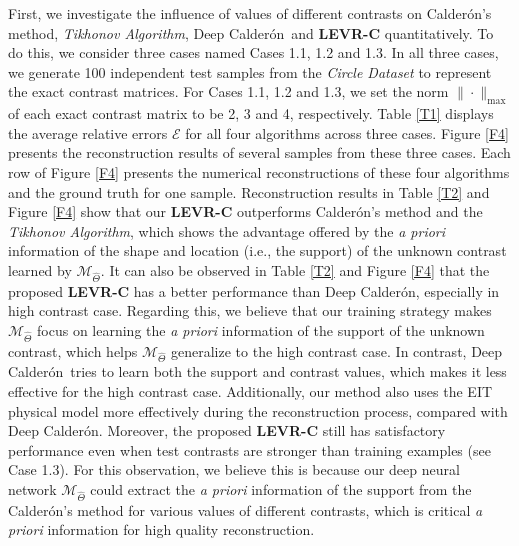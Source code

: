 \documentclass[11pt]{article}
\newcommand{\Calderon}{Calder\'{o}n}
\begin{document}
First, we investigate the influence of values of different contrasts on \Calderon's method, \textit{Tikhonov Algorithm}, Deep \Calderon\ and \textbf{LEVR-C} quantitatively.
To do this, we consider three cases named Cases 1.1, 1.2 and 1.3.
In all three cases, we generate 100 independent test samples from the \textit{Circle Dataset} to represent the exact contrast matrices.
For Cases 1.1, 1.2 and 1.3, we set the norm $\|\cdot\|_{\max}$ of each exact contrast matrix to be 2, 3 and 4, respectively.
Table \ref{T1} displays the average relative errors $\mathcal{E}$ for all four algorithms across three cases.
Figure \ref{F4} presents the reconstruction results of several samples from these three cases. 
Each row of Figure \ref{F4} presents the numerical reconstructions of these four algorithms and the ground truth for one sample. 
Reconstruction results in Table \ref{T2} and Figure \ref{F4} show that our \textbf{LEVR-C} outperforms \Calderon's method and the \textit{Tikhonov Algorithm}, which shows the advantage offered by the \textit{a priori} information of the shape and location (i.e., the support) of the unknown contrast learned by $\mathcal{M}_{\widehat{\Theta}}$.
It can also be observed in Table \ref{T2} and Figure \ref{F4} that the proposed \textbf{LEVR-C} has a better performance than Deep \Calderon, especially in high contrast case.
Regarding this, we believe that our training strategy makes $\mathcal{M}_{\widehat{\Theta}}$ focus on learning the \textit{a priori} information of the support of the unknown contrast, which helps $\mathcal{M}_{\widehat{\Theta}}$ generalize to the high contrast case.
In contrast, Deep \Calderon\ tries to learn both the support and contrast values, which makes it less effective for the high contrast case.
Additionally, our method also uses the EIT physical model more effectively during the reconstruction process, compared with Deep \Calderon.
Moreover, the proposed \textbf{LEVR-C} still has satisfactory performance even when test contrasts are stronger than training examples (see Case 1.3).
For this observation, we believe this is because our deep neural network $\mathcal{M}_{\widehat{\Theta}}$ could extract the \textit{a priori} information of the  support from the \Calderon's method for various values of different contrasts, which is critical \textit{a priori} information for high quality reconstruction.
\end{document}
